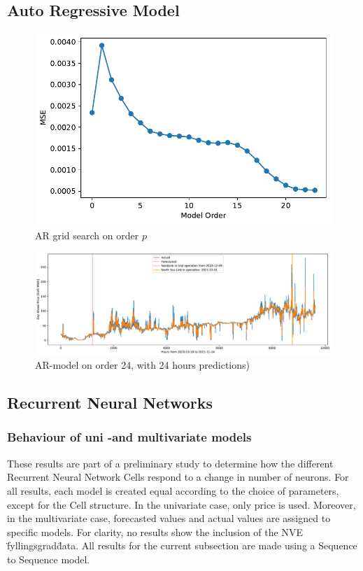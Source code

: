 \documentclass
[twocolumn,
secnumarabic,
nobibnotes,
aps,
prl,
reprint,
groupedaddress,
amsmath,
amssymb,
]{revtex4-2}
\begin{document}
\subsection{Auto Regressive Model}
\begin{figure}
  \includegraphics[width=\columnwidth]{figures/AR_gridsearch.pdf} 
  \caption{\label{fig:AR_gridsearch} AR grid search on order $p$}
\end{figure}

\begin{figure}
  \includegraphics[width= 2.1\columnwidth]{figures/AR(24)_daily predictions.pdf} 
  \caption{\label{fig:AR(24)_daily predictions} AR-model on order 24, with 24 hours predictions)}
  
\end{figure}





\subsection{Recurrent Neural Networks}

\subsubsection{Behaviour of uni -and multivariate models}
These results are part of a preliminary study to determine how the different Recurrent Neural Network Cells respond to a change in number of neurons. For all results, each model is created equal according to the choice of parameters, except for the Cell structure. In the univariate case, only price is used. Moreover, in the multivariate case, forecasted values and actual values are assigned to specific models. For clarity, no results show the inclusion of the NVE \"fyllingsgrad\" data. All results for the current subsection are made using a Sequence to Sequence model.
\end{document}
